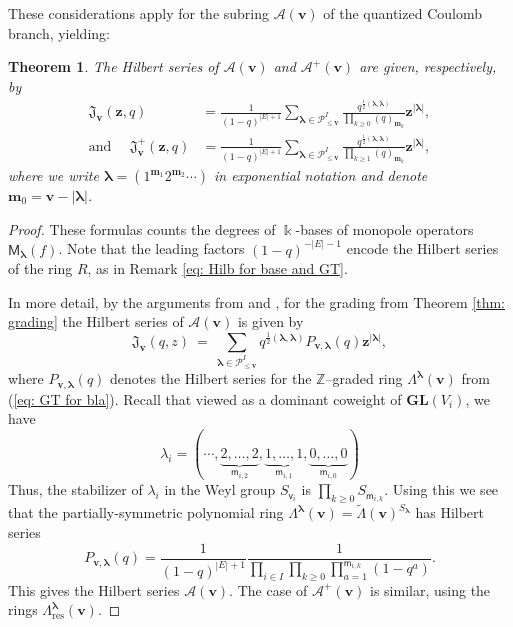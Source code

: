 \documentclass[11pt,reqno]{amsart}
\renewcommand{\mathbf}{\mathbold}
\numberwithin{equation}{section}
\newtheorem{Theorem}[equation]{Theorem}
\theoremstyle{definition}
\newcommand{\cA}{\mathcal{A}}
\newcommand{\fJ}{\mathfrak{J}}
\newcommand{\cP}{\mathcal{P}}
\newcommand{\bm}{\mathbf{m}}
\newcommand{\bv}{\mathbf{v}}
\newcommand{\bz}{\mathbf{z}}
\newcommand{\ZZ}{\mathbb{Z}}
\newcommand{\GL}{\mathbf{GL}}
\newcommand{\kk}{\Bbbk}
\renewcommand{\bv}{\mathbf{v}} %
\newcommand{\sv}{\mathsf{v}}
\newcommand{\sm}{\mathsf{m}}
\newcommand{\M}{\mathsf{M}}
\newcommand{\vertexset}{I}
\newcommand{\arrowset}{E}
\newcommand{\GT}{\Lambda}
\newcommand{\tGT}{\widetilde{\Lambda}}
\newcommand{\base}{R}
\newcommand{\Partitions}{\cP}
\newcommand{\la}{\lambda}
\newcommand{\bla}{{\boldsymbol{\lambda}}}
\newcommand{\qzast}{\cA}
\newcommand{\qzastplus}{\cA^{+}}
\newcommand{\res}{\mathrm{res}}
\begin{document}
These considerations apply for the subring $\qzast(\bv)$ of the quantized Coulomb branch, yielding:

\begin{Theorem}
\label{thm: monopole formula}
The Hilbert series  of $\qzast(\bv)$ and $\qzastplus(\bv)$ are given, respectively, by
\begin{align*}
    \fJ_\bv(\bz,q) &= \frac{1}{(1-q)^{|\arrowset|+1}} \sum_{\bla \in \Partitions^\vertexset_{\leq \bv}} \frac{q^{ \frac{1}{2} (\bla,\bla)}}{ \prod_{k \geq 0}  (q)_{\bm_k}} \bz^{|\bla|}, \\
    \text{and } \quad \fJ^+_\bv(\bz,q) &= \frac{1}{(1-q)^{|\arrowset|+1}} \sum_{\bla \in \Partitions^\vertexset_{\leq \bv}} \frac{q^{ \frac{1}{2} (\bla,\bla)}}{ \prod_{k \geq 1}  (q)_{\bm_k}} \bz^{|\bla|},
\end{align*}
where we write $\bla = (1^{\bm_1} 2^{\bm_2}\cdots)$ in exponential notation and denote $\bm_{0} = \bv - |\bla|$.
\end{Theorem}


\begin{proof}
These formulas counts the degrees of $\kk$-bases of monopole operators $\M_{\bla}(f)$.  Note that the leading factors $(1-q)^{-|\arrowset|-1}$ encode the Hilbert series of the ring $\base$, as in Remark \ref{eq: Hilb for base and GT}.

In more detail, by the arguments from \cite[\S 2(iii)]{BFN1} and \cite[Remark 2.8(2)]{BFN1}, for the grading from Theorem \ref{thm: grading} the Hilbert series of $\qzast(\bv)$ is given by 
\begin{equation}
\label{eq: monopole formula}
\fJ_\bv(q,z) \ = \  \sum_{\bla \in \Partitions^\vertexset_{\leq \bv}} q^{ \frac{1}{2}( \bla, \bla) } P_{\bv, \bla}(q) \bz^{|\bla|},
\end{equation}
where  $P_{\bv,\bla}(q)$ denotes the Hilbert series for the $\ZZ$--graded ring $\GT^{\bla}(\bv)$ from (\ref{eq: GT for bla}).  Recall that  viewed as a dominant coweight of $\GL(V_i)$, we have 
$$
\la_i = (\cdots, \underbrace{2,\ldots,2}_{\sm_{i,2}},\underbrace{1,\ldots,1}_{\sm_{i,1}}, \underbrace{0,\ldots,0}_{\sm_{i,0}})
$$
Thus, the stabilizer of $\la_i$ in the Weyl group $S_{\sv_i}$ is $\prod_{k \geq 0} S_{\sm_{i,k}}$. Using this we see that the partially-symmetric polynomial ring $\GT^\bla(\bv) = \tGT(\bv)^{S_{\bla}}$ has Hilbert series 
$$
P_{\bv, \bla}(q) = \frac{1}{(1-q)^{|\arrowset|+1}} \frac{1}{\prod_{i \in \vertexset} \prod_{k \geq 0} \prod_{a = 1}^{\sm_{i,k}}( 1 - q^a)}.
$$
This gives the Hilbert series $\qzast(\bv)$.  The case of $\qzastplus(\bv)$ is similar, using the rings $\GT_\res^\bla(\bv)$.
\end{proof}
\end{document}
